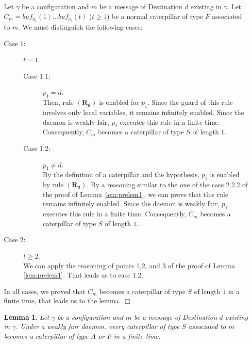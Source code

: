 \documentclass[11pt]{article}
\newtheorem{lemma}{Lemma}
\newenvironment{proof}{{\noindent\bf Proof. } }{{\hfill $\Box$}}
\begin{document}
\begin{proof}
Let $\gamma$ be a configuration and $m$ be a message of Destination $d$ existing in $\gamma$. Let $C_{m}=buf_{p_{1}}(1)...buf_{p_{t}}(t)$ ($t\geq1$) be a normal caterpillar of type $F$ associated to $m$. We must distinguish the following cases:

\begin{description}
\item [Case 1:] $t=1$.

\begin{description}
\item [Case 1.1:] $p_{1}=d$.\\
Then, rule $\boldsymbol{(R_{6})}$ is enabled for $p_{1}$. Since the guard of this rule involves only local variables, it remains infinitely enabled. Since the daemon is weakly fair, $p_{1}$ executes this rule in a finite time. Consequently, $C_{m}$ becomes a caterpillar of type $S$ of length $1$.
\item [Case 1.2:] $p_{1}\neq d$.\\
By the definition of a caterpillar and the hypothesis, $p_{1}$ is enabled by rule $\boldsymbol{(R_{2})}$. By a reasoning similar to the one of the case 2.2.2 of the proof of Lemma \ref{lem:prelem1}, we can prove that this rule remains infinitely enabled. Since the daemon is weakly fair, $p_{1}$ executes this rule in a finite time. Consequently, $C_{m}$ becomes a caterpillar of type $S$ of length $1$.
\end{description}

\item [Case 2:] $t\geq2$.\\
We can apply the reasoning of points 1,2, and 3 of the proof of Lemma \ref{lem:prelem1}. That leads us to case 1.2. 
\end{description}

In all cases, we proved that $C_{m}$ becomes a caterpillar of type $S$ of length $1$ in a finite time, that leads us to the lemma.
\end{proof}

\begin{lemma} \label{lem:prelem4}
Let $\gamma$ be a configuration and $m$ be a message of Destination $d$ existing in $\gamma$. Under a weakly fair daemon, every caterpillar of type $S$ associated to $m$ becomes a caterpillar of type $A$ or $F$ in a finite time.
\end{lemma}
\end{document}
